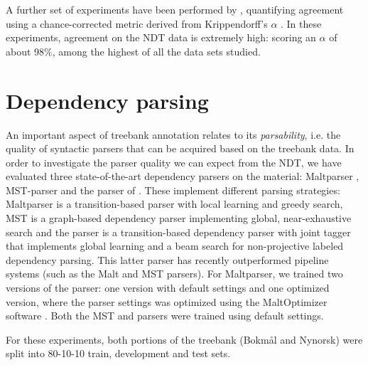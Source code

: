 \documentclass[10pt,a4paper]{article}
\begin{document}
A further set of experiments have been performed by ,
quantifying agreement using a chance-corrected metric derived from
Krippendorff's $\alpha$ \cite{Krippendorff:12}. In these experiments,
agreement on the NDT data is extremely high: scoring an $\alpha$ of about
98\%, among the highest of all the data sets studied.

\section{Dependency parsing}
An important aspect of treebank annotation relates to its \emph{parsability},
i.e. the quality of syntactic parsers that can be acquired based on
the treebank data.  In order to investigate the parser quality we can
expect from the NDT, we have evaluated three state-of-the-art dependency
parsers on the material: Maltparser \cite{Niv:Hal:Nil:06},
MST-parser \cite{McD:Per:Rib:Haj:05} and the parser of
. These implement different parsing strategies: Maltparser is a transition-based parser with local learning and greedy search, MST is a graph-based dependency parser implementing global, near-exhaustive search and the  parser is a transition-based dependency parser with joint tagger that
implements global learning and a beam search for non-projective labeled
dependency parsing. 
This latter parser has recently outperformed pipeline systems (such as the
Malt and MST parsers).
For Maltparser, we trained two versions of the
parser: one version with default settings and one optimized version,
where the parser settings was optimized using the MaltOptimizer
software \cite{Bal:Niv:12}. Both the MST and 
parsers were trained using default settings.

For these experiments, both portions of the treebank (Bokm{\aa}l and
Nynorsk) were split into 80-10-10 train, development and test sets.


\end{document}
